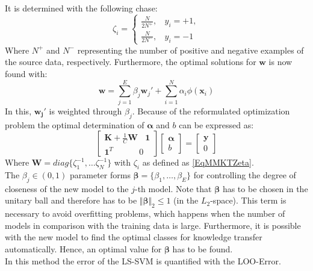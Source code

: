 It is determined with the following chase:\cite{Tommasi.}
\begin{equation}\label{EqMMKTZeta}
	\zeta_i = \begin{cases}
			\frac{N}{2N^+}, \>\>\>\> y_i = +1,\\
			\frac{N}{2N^-}, \>\>\>\> y_i = -1
	\end{cases}
\end{equation} 
Where $N^+$ and $N^-$ representing the number of positive and negative examples of the source data, respectively.
Furthermore, the optimal solutions for $\mathbf{w}$ is now found with:\cite{Tommasi.}
\begin{equation}
	\mathbf{w} = \sum_{j=1}^{E}\beta_j\mathbf{w}_j'+\sum_{i=1}^{N}\alpha_i\phi(\mathbf{x}_i)
\end{equation}
In this, $\mathbf{w_j}'$ is weighted through $\beta_j$.
Because of the reformulated optimization problem the optimal determination of $\boldsymbol{\alpha}$ and $b$ can be expressed as:\cite{Tommasi.}
\begin{equation}\label{EqMMKTParaEst}
\begin{bmatrix}
\mathbf{K}+\frac{1}{C}\mathbf{W} \>\>\>\> \mathbf{1}\\
\mathbf{1}^T \>\>\>\>\>\>\>\>\>\>\>\>\>\> 0
\end{bmatrix}
\begin{bmatrix}
\boldsymbol{\alpha}\\
b
\end{bmatrix}
= 
\begin{bmatrix}
\mathbf{y} \\
0
\end{bmatrix}
\end{equation}
Where $\mathbf{W} = diag\{\zeta_1^{-1},\dots\zeta_N^{-1}\}$ with $\zeta_i$ as defined as \eqref{EqMMKTZeta}.\\
The $\beta_j \in (0,1)$ parameter forms $\boldsymbol{\beta} = \{\beta_1,\dots,\beta_E \}$ for controlling the degree of closeness of the new model to the $j$-th model.
Note that $\boldsymbol{\beta}$ has to be chosen in the unitary ball and therefore has to be $\Vert\boldsymbol{\beta}\Vert_2\le 1$ (in the $L_2$-space).
This term is necessary to avoid overfitting problems, which happens when the number of models in comparison with the training data is large.
Furthermore, it is possible with the new model to find the optimal classes for knowledge transfer automatically.
Hence, an optimal value for $\boldsymbol{\beta}$ has to be found.\cite{Tommasi.}\\
In this method the error of the \acs{LS-SVM} is quantified with the \ac{LOO}-Error.\cite{Tommasi.}\\
